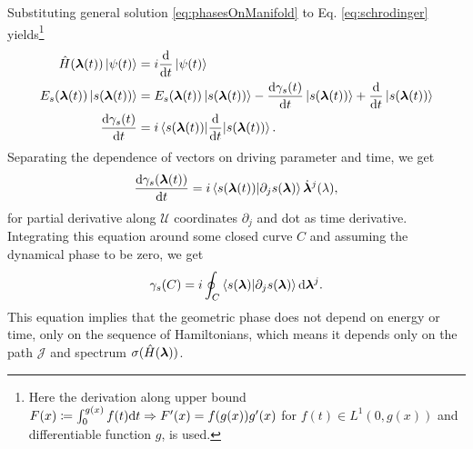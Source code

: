 Substituting general solution \ref{eq:phasesOnManifold} to Eq. \ref{eq:schrodinger} yields\footnote{Here the derivation along upper bound $F(x)\coloneqq\int_0^{g(x)}f(t)\mathrm{d} t \Rightarrow F'(x)=f(g(x))g'(x)$ for $f(t)\in L^1(0,g(x))$ and differentiable function $g$, is used.} 
\begin{align}
    \hat{H}({\bm\lambda}(t))\ket{\psi(t)} &= i\frac{\mathrm{d} }{\mathrm{d} t}\ket{\psi(t)}\\
    E_s({\bm\lambda}(t)) \ket{s({\bm\lambda}(t))} &= E_s({\bm\lambda}(t))\ket{s({\bm\lambda}(t))} -\frac{\mathrm{d} \gamma_s(t)}{\mathrm{d} t}\ket{s({\bm\lambda}(t))}+ \frac{\mathrm{d} }{\mathrm{d} t}\ket{s({\bm\lambda}(t))}\\
    \frac{\mathrm{d} \gamma_s(t)}{\mathrm{d} t}&=i\braket{s({\bm\lambda}(t))|
    \frac{\mathrm{d} }{\mathrm{d} t}|s({\bm\lambda}(t))}.
\end{align}
 Separating the dependence of vectors on driving parameter and time, we get
\begin{equation}
    \frac{\mathrm{d} \gamma_s({\bm\lambda}(t))}{\mathrm{d} t} =i\braket{s({\bm\lambda}(t))|\partial_j s({\bm\lambda})} \dot{{\bm\lambda}}^j(\lambda),
\end{equation}
for partial derivative along $\mathcal U$ coordinates $\partial_j$ and dot as time derivative. Integrating this equation around some closed curve $C$ and assuming the dynamical phase to be zero, we get
\begin{equation}
    \gamma_s(C)=i\oint_C\braket{s({\bm\lambda})|\partial_j s({\bm\lambda})}\mathrm{d} {\bm\lambda}^j.
    \label{eq:gammaCoint}
\end{equation}
This equation implies that the geometric phase does not depend on energy or time, only on the sequence of Hamiltonians, which means it depends only on the path $\mathcal J$ and spectrum $\sigma(\hat{H}({\bm\lambda}))$.



